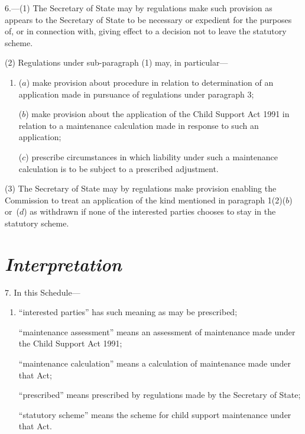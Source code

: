 \documentclass[12pt,a4paper]{article}
\begin{document}
6.---(1) The Secretary of State may by regulations make such provision as appears to the Secretary of State to be necessary or expedient for the purposes of, or in connection with, giving effect to a decision not to leave the statutory scheme.

(2) Regulations under sub-paragraph (1) may, in particular—
\begin{enumerate}\item[]
($a$) make provision about procedure in relation to determination of an application made in pursuance of regulations under paragraph 3;

($b$) make provision about the application of the Child Support Act 1991 in relation to a maintenance calculation made in response to such an application;

($c$) prescribe circumstances in which liability under such a maintenance calculation is to be subject to a prescribed adjustment.
\end{enumerate}

(3) The Secretary of State may by regulations make provision enabling the Commission to treat an application of the kind mentioned in paragraph 1(2)($b$) or~($d$) as withdrawn if none of the interested parties chooses to stay in the statutory scheme.


\section*{\itshape Interpretation}

7. In this Schedule—
\begin{enumerate}\item[]
    “interested parties” has such meaning as may be prescribed;

    “maintenance assessment” means an assessment of maintenance made under the Child Support Act 1991;

    “maintenance calculation” means a calculation of maintenance made under that Act;

    “prescribed” means prescribed by regulations made by the Secretary of State;

    “statutory scheme” means the scheme for child support maintenance under that Act. 
\end{enumerate}

\end{document}
